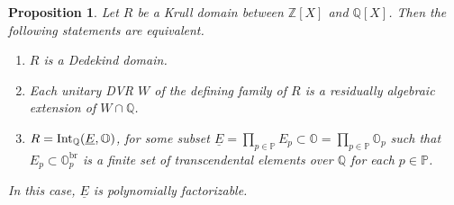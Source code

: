 \documentclass[10pt]{article}
\numberwithin{equation}{section}
\newtheorem{Prop}[equation]{Proposition}
\theoremstyle{definition}
\theoremstyle{definition}
\newcommand{\Q}{\mathbb{Q}}
\newcommand{\Z}{\mathbb{Z}}
\renewcommand{\O}{\mathbb{O}}
\newcommand{\PP}{\mathbb{P}}
\newcommand{\Int}{\textnormal{Int}}
\newcommand{\IntQ}{\Int_{\Q}}
\newcommand{\uE}{\underline{E}}
\newcommand{\br}{\text{br}}
\begin{document}
\begin{Prop}\label{Krull Dedekind}
Let $R$ be a Krull domain between $\Z[X]$ and $\Q[X]$. Then the following statements 
are equivalent.
\begin{enumerate}
\item[{\em (1)}] $R$ is a Dedekind domain.
\item[{\em (2)}] Each unitary DVR $W$ of the defining family of $R$ is a residually algebraic extension of $W\cap\Q$. 
\item[{\em (3)}] $R = \IntQ(\uE,\O)$, for some subset $\uE=\prod\limits_{p\in\PP}E_p\subset\O=\prod\limits_{p\in\PP}\O_p$ such that $E_p\subset\O_p^{\br}$ is a finite set of transcendental elements over $\Q$ for each $p\in\PP$. 
\end{enumerate}
 In this case, $\uE$ is polynomially factorizable.
\end{Prop}


\end{document}
